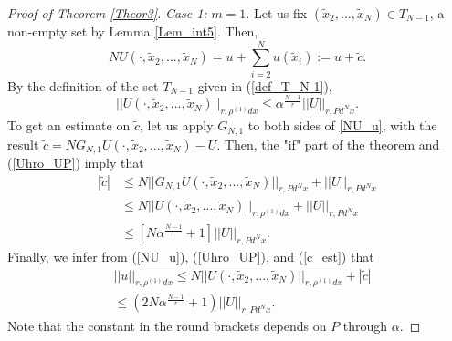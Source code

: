 \documentclass[12pt,leqno]{amsart}
\numberwithin{equation}{section}
\numberwithin{theor}{section}
\numberwithin{rem}{section}
\begin{document}
\begin{proof}[Proof of Theorem \ref{Theor3}]
\textit{Case 1:}  $m=1$.   
Let us fix $(\tilde{x}_2,...,\tilde{x}_N)\in T_{N-1}$, a non-empty set by Lemma \ref{Lem_int5}.   Then,
\begin{equation}
\label{NU_u}
NU(\cdot,\tilde{x}_2,...,\tilde{x}_N)=u + \sum_{i=2}^N 
u(\tilde{x}_i):=u +\tilde{c}.
\end{equation}
By the definition of the set $T_{N-1}$ given in (\ref{def_T_N-1}),
\begin{equation}
\label{Uhro_UP}
|| U(\cdot,\tilde{x}_2,...,\tilde{x}_N)||_{r,\rho^{(1)} dx } \leq 
\alpha^{\frac{N-1}{r}} || U ||_{r,Pd^{N}x} .  
\end{equation}
To get an estimate on $\tilde{c}$, let us apply $G_{N,1}$ to 
both sides of \ref{NU_u}, with the result 
$\tilde{c}=N G_{N,1} U(\cdot,\tilde{x}_2,...,\tilde{x}_N) - U$.  
Then, the "if" part of the theorem and (\ref{Uhro_UP}) 
imply that 
\begin{equation}
\label{c_est}
\begin{split}
|\tilde{c}|&\leq N || G_{N,1} U
(\cdot,\tilde{x}_2,...,\tilde{x}_N)||_{r,Pd^{N}x} + 
|| U ||_{r,Pd^{N}x}\\
&\leq N || U
(\cdot,\tilde{x}_2,...,\tilde{x}_N)||_{r,\rho^{(1)}dx} + 
|| U ||_{r,Pd^{N}x}\\
&\leq \left [ 
N \alpha^{\frac{N-1}{r}}
+1 \right ]
|| U ||_{r,Pd^{N}x}.
\end{split}
\end{equation}
Finally, we infer from (\ref{NU_u}), (\ref{Uhro_UP}), and (\ref{c_est}) that 
\begin{equation}
\begin{split}
&|| u ||_{r,\rho^{(1)}dx} \leq N || U(\cdot,\tilde{x}_2,...,\tilde{x}_N)||_{r,\rho^{(1)}dx} + |\tilde{c}|\\
&\leq \left (
2N \alpha^{\frac{N-1}{r}} 
+1 \right ) || U ||_{r,Pd^{N}x}.  
\end{split}
\end{equation}
Note that the constant in the round brackets depends on 
$P$ through $\alpha$.  


\end{proof}
\end{document}
